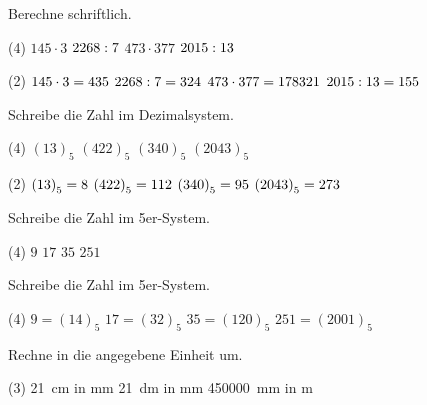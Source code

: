\documentclass[
	full-,
	a5paper,
	Probe,
	]{KA} %
\begin{document}
\begin{Aufgabe*}{0} %
	Berechne schriftlich.
	\begin{tasks}(4)
		\task $145\cdot 3$
		\task $\inteval{324*7}:7$
		\task $473\cdot 377$
		\task $\inteval{155*13}:13$
	\end{tasks}
\end{Aufgabe*}
\begin{Loesung}
	\begin{tasks}(2)
		\task $145\cdot 3=\inteval{145*3}$
		\task $\inteval{324*7}:7=324$
		\task $473\cdot 377=\inteval{473*377}$
		\task $\inteval{155*13}:13=155$
	\end{tasks}
\end{Loesung}
\begin{Aufgabe*}{0} %
	Schreibe die Zahl im Dezimalsystem.
	\begin{tasks}(4)
		\task ${(13)}_5$
		\task ${(422)}_5$
		\task ${(340)}_5$
		\task ${(2043)}_5$
	\end{tasks}
\end{Aufgabe*}
\begin{Loesung} %
	\begin{tasks}(2)
		\task ${(13)}_5=\inteval{5+3}$
		\task ${(422)}_5=\inteval{4*25+2*5+2}$
		\task ${(340)}_5=\inteval{3*25+4*5}$
		\task ${(2043)}_5=\inteval{2*125+4*5+3}$
	\end{tasks}
\end{Loesung}
\begin{Aufgabe*}{0} %
	Schreibe die Zahl im 5er-System.
	\begin{tasks}(4)
		\task $9$
		\task $17$
		\task $35$
		\task $251$
	\end{tasks}
\end{Aufgabe*}
\begin{Loesung} %
	Schreibe die Zahl im 5er-System.
	\begin{tasks}(4)
		\task $9={(14)}_5$
		\task $17={(32)}_5$
		\task $35={(120)}_5$
		\task $251={(2001)}_5$
	\end{tasks}
\end{Loesung}
\begin{Aufgabe*}{0} %
	Rechne in die angegebene Einheit um.
	\begin{tasks}(3)
		\task \SI{21}{\centi\meter} in \si{\milli\meter}
		\task \SI{21}{\deci\meter} in \si{\milli\meter}
		\task \SI{450000}{\milli\meter} in \si{\meter}
	\end{tasks}
\end{Aufgabe*}
\end{document}

